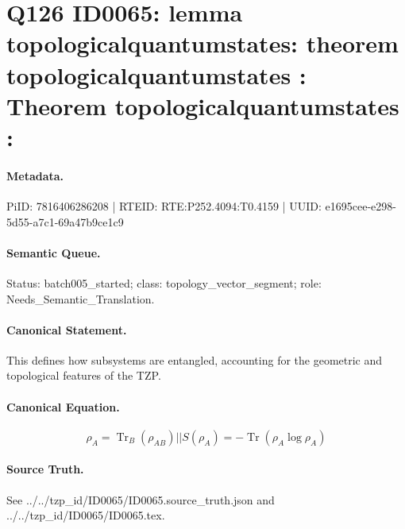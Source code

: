 \section*{Q126 ID0065: lemma topologicalquantumstates: theorem topologicalquantumstates : Theorem topologicalquantumstates :}
\paragraph{Metadata.}
PiID: 7816406286208 | RTEID: RTE:P252.4094:T0.4159 | UUID: e1695cee-e298-5d55-a7c1-69a47b9ce1c9

\paragraph{Semantic Queue.}
Status: batch005\_started; class: topology\_vector\_segment; role: Needs\_Semantic\_Translation.

\paragraph{Canonical Statement.}
This defines how subsystems are entangled, accounting for the geometric and topological features of the TZP.

\paragraph{Canonical Equation.}
\[
\rho_{A} = \operatorname{Tr}_{B}(\rho_{AB}) || S(\rho_{A}) = -\operatorname{Tr}\!\left(\rho_{A}\log\rho_{A}\right)
\]

\paragraph{Source Truth.}
See ../../tzp\_id/ID0065/ID0065.source\_truth.json and ../../tzp\_id/ID0065/ID0065.tex.

